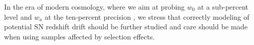 \documentclass[]{aa} %
\newcommand{\nn}[1]{{\textcolor[rgb]{0.25, 0.50, 0}{#1}}}
\newcommand{\agk}[1]{\textcolor{purple}{AK: #1}}
\begin{document}


In the era of modern cosmology, where we aim at probing $w_0$ at a sub-percent level and $w_a$ at the ten-percent precision \citep[e.g.,][]{lsstpaper}, we stress that correctly modeling of potential SN redshift drift should be further studied and care should be made when using samples affected by selection effects.
\end{document}
